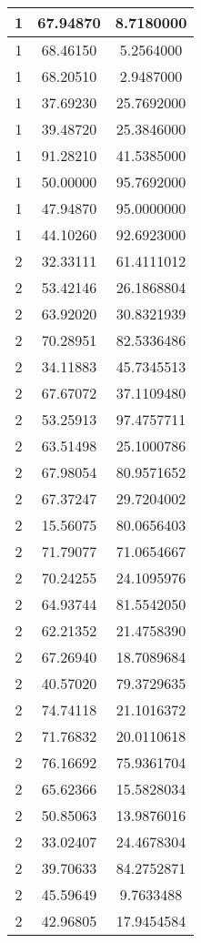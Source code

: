 \documentclass[
]{book}
\begin{document}
\begin{tabular}{c|c|c}
\hline
1 & 67.94870 & 8.7180000\\
\hline
1 & 68.46150 & 5.2564000\\
\hline
1 & 68.20510 & 2.9487000\\
\hline
1 & 37.69230 & 25.7692000\\
\hline
1 & 39.48720 & 25.3846000\\
\hline
1 & 91.28210 & 41.5385000\\
\hline
1 & 50.00000 & 95.7692000\\
\hline
1 & 47.94870 & 95.0000000\\
\hline
1 & 44.10260 & 92.6923000\\
\hline
2 & 32.33111 & 61.4111012\\
\hline
2 & 53.42146 & 26.1868804\\
\hline
2 & 63.92020 & 30.8321939\\
\hline
2 & 70.28951 & 82.5336486\\
\hline
2 & 34.11883 & 45.7345513\\
\hline
2 & 67.67072 & 37.1109480\\
\hline
2 & 53.25913 & 97.4757711\\
\hline
2 & 63.51498 & 25.1000786\\
\hline
2 & 67.98054 & 80.9571652\\
\hline
2 & 67.37247 & 29.7204002\\
\hline
2 & 15.56075 & 80.0656403\\
\hline
2 & 71.79077 & 71.0654667\\
\hline
2 & 70.24255 & 24.1095976\\
\hline
2 & 64.93744 & 81.5542050\\
\hline
2 & 62.21352 & 21.4758390\\
\hline
2 & 67.26940 & 18.7089684\\
\hline
2 & 40.57020 & 79.3729635\\
\hline
2 & 74.74118 & 21.1016372\\
\hline
2 & 71.76832 & 20.0110618\\
\hline
2 & 76.16692 & 75.9361704\\
\hline
2 & 65.62366 & 15.5828034\\
\hline
2 & 50.85063 & 13.9876016\\
\hline
2 & 33.02407 & 24.4678304\\
\hline
2 & 39.70633 & 84.2752871\\
\hline
2 & 45.59649 & 9.7633488\\
\hline
2 & 42.96805 & 17.9454584\\

\end{tabular}
\end{document}
